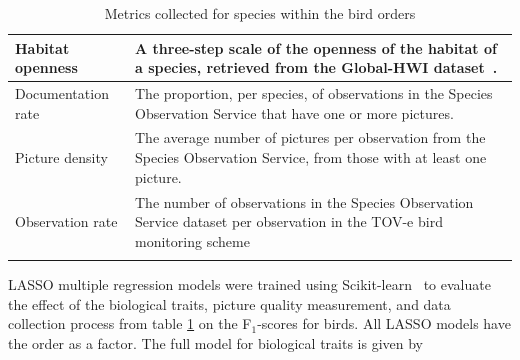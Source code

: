 \documentclass{article}
\begin{document}
\begin{longtable}{|p{} | p{} |}
  \hline
  Habitat openness   & A three-step scale of the openness of the habitat of a species, retrieved from the Global-HWI dataset~\cite{Sheard2020}.                                                                                                                                                                                                                                                                                                                                                                   \\
  \hline
  Documentation rate & The proportion, per species, of observations in the Species Observation Service that have one or more pictures.                                                                                                                                                                                                                                                                                                                                                                            \\
  \hline
  Picture density    & The average number of pictures per observation from the Species Observation Service, from those with at least one picture.                                                                                                                                                                                                                                                                                                                                                                 \\
  \hline
  Observation rate   & The number of observations in the Species Observation Service dataset per observation in the TOV-e bird monitoring scheme~\cite{Kalas}                                                                                                                                                                                                                                                                                                                                                     \\[1ex]
  \hline
  \caption{\footnotesize Metrics collected for species within the bird orders}
  \label{tab:birdmetrics}
\end{longtable}

LASSO multiple regression models were trained using Scikit-learn~\cite{Pedregosa} to evaluate the effect of the biological traits, picture quality measurement, and data collection process from table \ref{tab:birdmetrics} on the F$_1$-scores for birds. All LASSO models have the order as a factor. The full model for biological traits is given by
\end{document}
